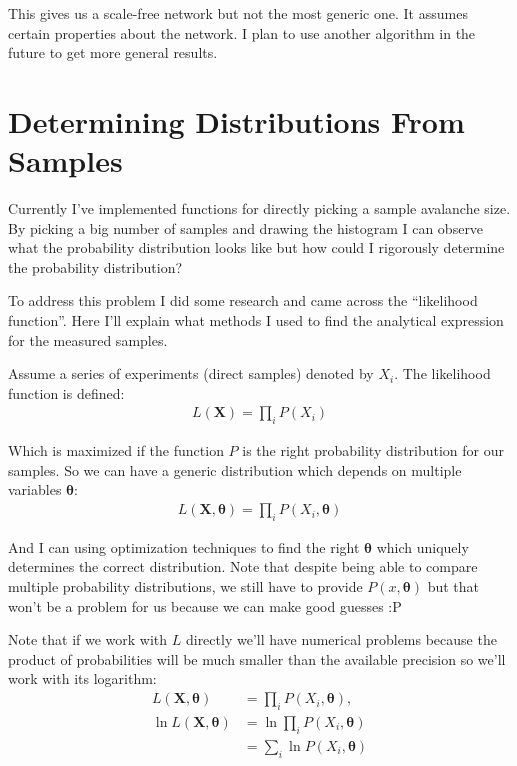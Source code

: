 \documentclass{article}
\begin{document}
This gives us a scale-free network but not the most generic one. It
assumes certain properties about the network. I plan to use another
algorithm in the future to get more general results.
\section{Determining Distributions From Samples}
\label{sec:orgb89f7cd}
Currently I've implemented functions for directly picking a sample
avalanche size. By picking a big number of samples and drawing the
histogram I can observe what the probability distribution looks like
but how could I rigorously determine the probability distribution?

To address this problem I did some research and came across the
``likelihood function''. Here I'll explain what methods I used to
find the analytical expression for the measured samples.

Assume a series of experiments (direct samples) denoted by \(X_i\). The
likelihood function is defined:
\begin{gather}
  L(\boldsymbol{X}) = \prod_{i}P(X_i)
\end{gather}

Which is maximized if the function \(P\) is the right probability
distribution for our samples. So we can have a generic distribution
which depends on multiple variables \(\boldsymbol{\theta}\):
\begin{gather}
  L(\boldsymbol{X},\boldsymbol{\theta}) =  \prod_{i}P(X_i,\boldsymbol{\theta})
\end{gather}

And I can using optimization techniques to find the right
\(\boldsymbol{\theta}\) which uniquely determines the correct
distribution. Note that despite being able to compare multiple
probability distributions, we still have to provide
\(P(x,\boldsymbol{\theta})\) but that won't be a problem for us because
we can make good guesses :P

Note that if we work with \(L\) directly we'll have numerical problems
because the product of probabilities will be much smaller than the
available precision so we'll work with its logarithm:
\begin{align}
  L(\boldsymbol{X},\boldsymbol{\theta}) &=  \prod_{i}P(X_i,\boldsymbol{\theta}),\\
  \ln L(\boldsymbol{X},\boldsymbol{\theta}) &= \ln  \prod_{i}P(X_i,\boldsymbol{\theta})\\
    &= \sum_i \ln P(X_i,\boldsymbol{\theta})
\end{align}
\end{document}
